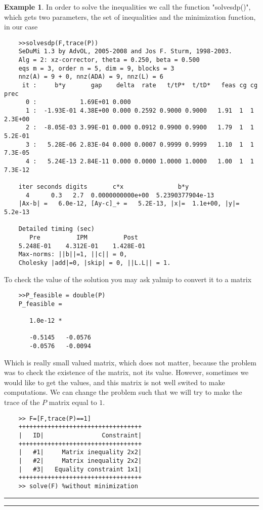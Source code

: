 \documentclass[nols]{tufte-handout}
\theoremstyle{definition}
\newtheorem{exmp}{Example}[section]
\begin{document}
\begin{exmp}
In order to solve the inequalities we call the function "solvesdp()", which gets two parameters, the set of inequalities and the minimization function, in our case
\begin{verbatim}
    >>solvesdp(F,trace(P))
    SeDuMi 1.3 by AdvOL, 2005-2008 and Jos F. Sturm, 1998-2003.
    Alg = 2: xz-corrector, theta = 0.250, beta = 0.500
    eqs m = 3, order n = 5, dim = 9, blocks = 3
    nnz(A) = 9 + 0, nnz(ADA) = 9, nnz(L) = 6
     it :     b*y       gap    delta  rate   t/tP*  t/tD*   feas cg cg  prec
      0 :            1.69E+01 0.000
      1 :  -1.93E-01 4.38E+00 0.000 0.2592 0.9000 0.9000   1.91  1  1  2.3E+00
      2 :  -8.05E-03 3.99E-01 0.000 0.0912 0.9900 0.9900   1.79  1  1  5.2E-01
      3 :   5.28E-06 2.83E-04 0.000 0.0007 0.9999 0.9999   1.10  1  1  7.3E-05
      4 :   5.24E-13 2.84E-11 0.000 0.0000 1.0000 1.0000   1.00  1  1  7.3E-12

    iter seconds digits       c*x               b*y
      4      0.3   2.7  0.0000000000e+00  5.2390377904e-13
    |Ax-b| =   6.0e-12, [Ay-c]_+ =   5.2E-13, |x|=  1.1e+00, |y|=  5.2e-13

    Detailed timing (sec)
       Pre          IPM          Post
    5.248E-01    4.312E-01    1.428E-01    
    Max-norms: ||b||=1, ||c|| = 0,
    Cholesky |add|=0, |skip| = 0, ||L.L|| = 1.

\end{verbatim}
To check the value of the solution you may ask yalmip to convert it to a matrix
\begin{verbatim}
    >>P_feasible = double(P)
    P_feasible =

       1.0e-12 *

       -0.5145   -0.0576
       -0.0576   -0.0094
\end{verbatim}
Which is really small valued matrix, which does not matter, because the problem was to check the existence of the matrix, not its value. However, sometimes we would like to get the values, and this matrix is not well swited to make computations. We can change the problem such that we will try to make the trace of the $P$ matrix equal to $1$.
\begin{verbatim}
    >> F=[F,trace(P)==1]
    ++++++++++++++++++++++++++++++++++
    |   ID|                Constraint|
    ++++++++++++++++++++++++++++++++++
    |   #1|     Matrix inequality 2x2|
    |   #2|     Matrix inequality 2x2|
    |   #3|   Equality constraint 1x1|
    ++++++++++++++++++++++++++++++++++ 
    >> solve(F) %without minimization
\end{verbatim}
\end{exmp}
\hrule
\hrule
\vspace{0.5cm}
\end{document}
